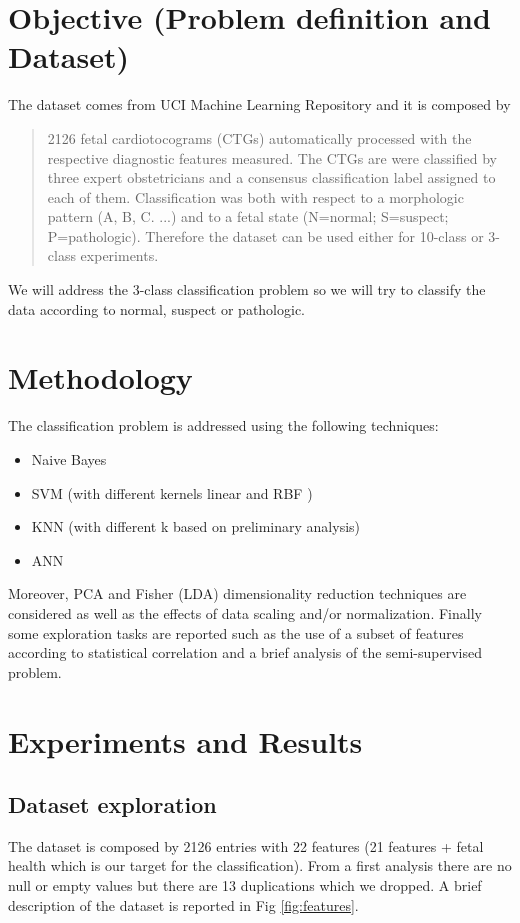 \documentclass[a4paper,12pt]{article}
\begin{document}
\section{Objective (Problem definition and Dataset)}
The dataset comes from UCI Machine Learning Repository \cite{uci} and it is composed by 
\begin{quote}
2126 fetal cardiotocograms (CTGs) automatically processed with the respective diagnostic features measured. The CTGs are were classified by three expert obstetricians and a consensus classification label assigned to each of them. Classification was both with respect to a morphologic pattern (A, B, C. ...) and to a fetal state (N=normal; S=suspect; P=pathologic). Therefore the dataset can be used either for 10-class or 3-class experiments.
\end{quote}
We will address the 3-class classification problem so we will try to classify the data according to normal, suspect or pathologic.

\section{Methodology}
The classification problem is addressed using the following techniques:

\begin{itemize}
  \item Naive Bayes \cite{ml}
  \item SVM (with different kernels linear and RBF ) \cite{ml}
  \item KNN (with different k based on preliminary analysis) \cite{ml}
  \item ANN \cite{ann}
\end{itemize}
Moreover, PCA and Fisher (LDA) dimensionality reduction techniques are considered as well as the effects of data scaling and/or normalization. Finally some exploration tasks are reported such as the use of a subset of features according to statistical correlation and a brief analysis of the semi-supervised problem.
\section{Experiments and Results}
\subsection{Dataset exploration}
The dataset is composed by 2126 entries with 22 features (21 features + fetal health which is our target for the classification). From a first analysis there are no null or empty values but there are 13 duplications which we dropped. A brief description of the dataset is reported in Fig \ref{fig:features}.
\end{document}
